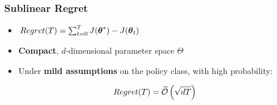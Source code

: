 \documentclass[aspectratio=169, table]{beamer}
\newcommand{\enb}[1]{\textcolor{poliblue1}{\textbf{#1}}}
\begin{document}
\begin{frame}
\begin{overlayarea}{\textwidth}{.25\textheight}
{}
\end{overlayarea}
\end{frame}

\begin{frame} 
\frametitle{Sublinear Regret}
\begin{overlayarea}{\textwidth}{.4\textheight}
\begin{itemize}
	\setlength{\itemsep}{20pt}
	\item<1-> $\mathop{Regret}(T) = \sum_{t=0}^T J(\boldsymbol{\theta}^*) - J(\boldsymbol{\theta}_t)$
	\vfill
	\item<2-> \enb{Compact}, $d$-dimensional parameter space $\Theta$
	\vfill
	\item<3-> Under \enb{mild assumptions} on the policy class, with high probability:
\end{itemize}
\end{overlayarea}
\LARGE
\begin{align*}
\mathop{Regret}(T) = \widetilde{\mathcal{O}}\left(\sqrt{dT}\right)
\end{align*}
\end{frame}
\end{document}
